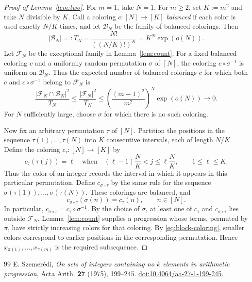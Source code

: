 \documentclass[10pt,a4paper]{amsart}
\numberwithin{equation}{section}
\newcommand{\calF}{\mathcal F}
\newcommand{\calB}{\mathcal B}
\begin{document}
\begin{proof}[Proof of Lemma~\ref{lem:two}]
For $m=1$, take $N=1$. For $m\geq2$, set $K:=m^2$ and take $N$ divisible by $K$. Call a coloring $c:[N]\to[K]$ \emph{balanced} if each color is used exactly $N/K$ times, and let $\calB_N$ be the family of balanced colorings. Then
\[
 |\calB_N|=:T_N=\frac{N!}{((N/K)!)^K}=K^N\exp(o(N)).
\]
Let $\calF_N$ be the exceptional family in Lemma~\ref{lem:count}. For a fixed balanced coloring $c$ and a uniformly random permutation $\sigma$ of $[N]$, the coloring $c\circ\sigma^{-1}$ is uniform on $\calB_N$. Thus the expected number of balanced colorings $c$ for which both $c$ and $c\circ\sigma^{-1}$ belong to $\calF_N$ is
\[
 \frac{|\calF_N\cap\calB_N|^2}{T_N}
 \leq\frac{|\calF_N|^2}{T_N}
 \leq\left(\frac{(m-1)^2}{m^2}\right)^N\exp(o(N))\longrightarrow0.
\]
For $N$ sufficiently large, choose $\sigma$ for which there is no such coloring.

Now fix an arbitrary permutation $\tau$ of $[N]$. Partition the positions in the sequence $\tau(1),\ldots,\tau(N)$ into $K$ consecutive intervals, each of length $N/K$. Define the coloring $c_\tau:[N]\to[K]$ by
\begin{equation}\label{eq:block-coloring}
 c_\tau(\tau(j))=\ell
 \quad\text{when}\quad
 (\ell-1)\frac{N}{K}<j\leq\ell\frac{N}{K},
 \qquad 1\leq\ell\leq K.
\end{equation}
Thus the color of an integer records the interval in which it appears in this particular permutation. Define $c_{\sigma\circ\tau}$ by the same rule for the sequence $\sigma(\tau(1)),\ldots,\sigma(\tau(N))$. These colorings are balanced, and
\[
 c_{\sigma\circ\tau}(\sigma(n))=c_\tau(n),
 \qquad n\in[N].
\]
In particular, $c_{\sigma\circ\tau}=c_\tau\circ\sigma^{-1}$. By the choice of $\sigma$, at least one of $c_\tau$ and $c_{\sigma\circ\tau}$ lies outside $\calF_N$. Lemma~\ref{lem:count} supplies a progression whose terms, permuted by $\pi$, have strictly increasing colors for that coloring. By \eqref{eq:block-coloring}, smaller colors correspond to earlier positions in the corresponding permutation. Hence $x_{\pi(1)},\ldots,x_{\pi(m)}$ is the required subsequence.
\end{proof}

\begin{thebibliography}{99}
 E. Szemer\'edi, \emph{On sets of integers containing no $k$ elements in arithmetic progression}, Acta Arith. \textbf{27} (1975), 199--245. \href{https://doi.org/10.4064/aa-27-1-199-245}{doi:10.4064/aa-27-1-199-245}.
\end{thebibliography}
\end{document}
